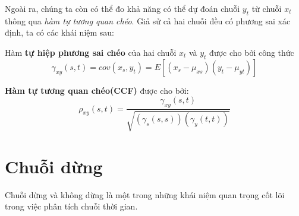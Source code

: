 Ngoài ra, chúng ta còn có thể đo khả năng có thể dự đoán chuỗi $y_t$ từ chuỗi $x_t$ thông qua \textit{hàm tự tương quan chéo}. Giả sử cả hai chuỗi đều có phương sai xác định, ta có các khái niệm sau:
\begin{defi}
Hàm \textbf{tự hiệp phương sai chéo} của hai chuỗi $x_t$ và $y_t$ được cho bởi công thức
\begin{equation}
		\gamma_{xy}(s,t) = cov(x_s,y_t) = E[(x_s - \mu_{xs})(y_t - \mu_{yt} )]
\end{equation}
\end{defi}
\begin{defi}
\textbf{Hàm tự tương quan chéo(CCF)}\citep{tsa3} được cho bởi:
	\begin{equation}
		\rho_{xy}(s,t) = \frac{\gamma_{xy}(s,t)}{\sqrt{(\gamma_s(s,s))(\gamma_y(t,t))}}
	\end{equation}
\end{defi}

\section{Chuỗi dừng} \label{sec:sta}
Chuỗi dừng và không dừng là một trong những khái niệm quan trọng cốt lõi trong việc phân tích chuỗi thời gian.
